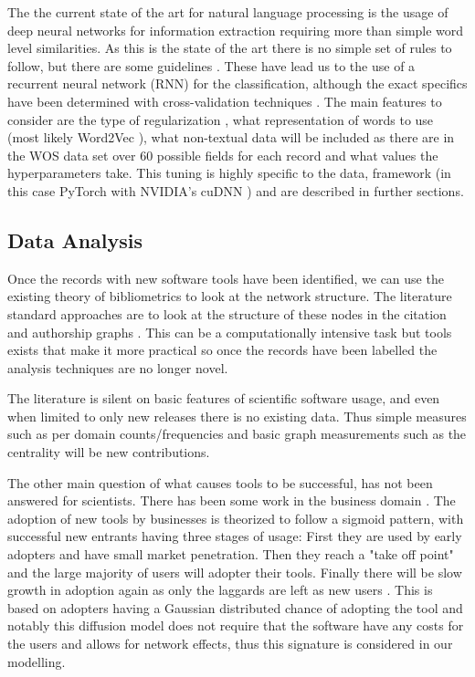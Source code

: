 \documentclass[12pt, a4paper]{article}
\begin{document}
The the current state of the art for natural language processing is the usage of deep neural networks for information extraction requiring more than simple word level similarities\citep{manning-EtAl}. As this is the state of the art there is no simple set of rules to follow, but there are some guidelines \citep{Goodfellow-et-al-2016}. These have lead us to the use of a recurrent neural network (RNN) \citep{mikolov2010recurrent} for the classification, although the exact specifics have been determined with cross-validation techniques \citep{james2013introduction}. The main features to consider are the type of regularization \citep{Goodfellow-et-al-2016}, what representation of words to use (most likely Word2Vec \citep{mikolov2013distributed}), what non-textual data will be included as there are in the WOS data set over 60 possible fields for each record \citep{mkdocs} and what values the hyperparameters take\citep{Goodfellow-et-al-2016}. This tuning is highly specific to the data, framework (in this case PyTorch \citep{pytorch} with NVIDIA's cuDNN \citep{chetlur2014cudnn}) and are described in further sections.

\subsection{Data Analysis}

Once the records with new software tools have been identified, we can use the existing theory of bibliometrics to look at the network structure. The literature standard approaches are to look at the structure of these nodes in the citation and authorship graphs \citep{de2002pattern}\citep{lariviere2006canadian}\citep{borgatti2009network}. This can be a computationally intensive task but tools exists that make it more practical \citep{mclevey2017introducing} so once the records have been labelled the analysis techniques are no longer novel.

The literature is silent on basic features of scientific software usage, and even when limited to only new releases there is no existing data. Thus simple measures such as per domain counts/frequencies and basic graph measurements such as the centrality will be new contributions. 

The other main question of what causes tools to be successful, has not been answered for scientists. There has been some work in the business domain \citep{xin2008software}\citep{hsu2009computer}. The adoption of new tools by businesses is theorized to follow a sigmoid pattern, with successful new entrants having three stages of usage: First they are used by early adopters and have small market penetration. Then they reach a "take off point" and the large majority of users will adopter their tools. Finally there will be slow growth in adoption again as only the laggards are left as new users \citep{xin2008software}. This is based on adopters having a Gaussian distributed chance of adopting the tool and notably this diffusion model does not require that the software have any costs for the users and allows for network effects, thus this signature is considered in our modelling.
\end{document}
